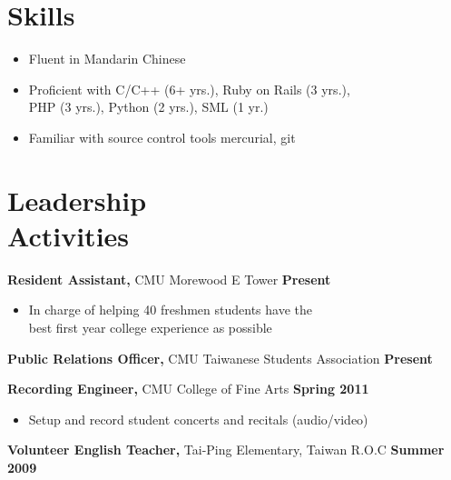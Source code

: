 \documentclass[sectioned]{dsyangres}
\begin{document}
\begin{resume}
\section{Skills}

\begin{itemize} \itemsep -2pt
  \item Fluent in Mandarin Chinese
  \item Proficient with C/C++ (6+ yrs.), Ruby on Rails (3 yrs.),\\
    PHP (3 yrs.), Python (2 yrs.), SML (1 yr.)
  \item Familiar with source control tools mercurial, git
\end{itemize}



\section{Leadership \\ Activities}

\textbf{Resident Assistant,} CMU Morewood E Tower \hfill \textbf{Present}
  \begin{itemize} \itemsep -2pt
    \item In charge of helping 40 freshmen students have the\\ best
      first year college experience as possible
  \end{itemize}

\textbf{Public Relations Officer,} CMU Taiwanese Students
  Association \hfill \textbf{ Present}

\textbf{Recording Engineer,} CMU College of Fine Arts \hfill
\textbf{ Spring 2011}
  \begin{itemize} \itemsep -2pt
    \item Setup and record student concerts and recitals (audio/video)
  \end{itemize}

\textbf{Volunteer English Teacher,} Tai-Ping Elementary, Taiwan R.O.C \hfill \textbf{ Summer 2009}

\end{resume}
\end{document}

